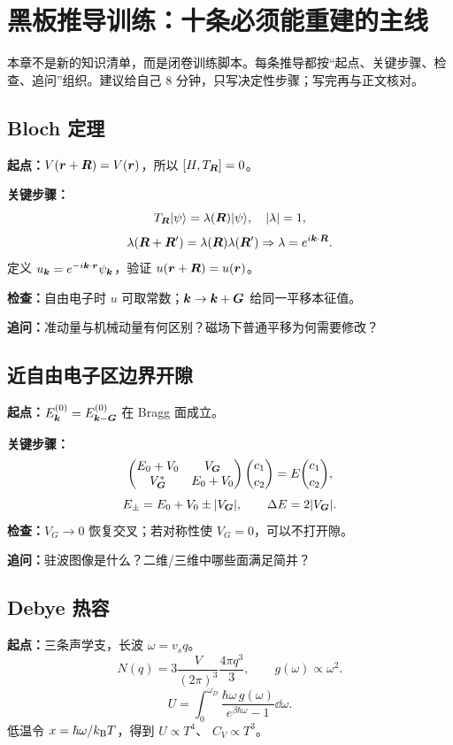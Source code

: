 \chapter{黑板推导训练：十条必须能重建的主线}

\begin{mapbox}
本章不是新的知识清单，而是闭卷训练脚本。每条推导都按“起点、关键步骤、检查、追问”组织。建议给自己 8 分钟，只写决定性步骤；写完再与正文核对。
\end{mapbox}

\section{Bloch 定理}
\textbf{起点：}$V(\bm{r}+\bm{R})=V(\bm{r})$，所以
$[H,T_{\bm{R}}]=0$。

\textbf{关键步骤：}
\[
T_{\bm{R}}|\psi\rangle=\lambda(\bm{R})|\psi\rangle,\quad
|\lambda|=1,
\]
\[
\lambda(\bm{R}+\bm{R}')=\lambda(\bm{R})\lambda(\bm{R}')
\Rightarrow\lambda=e^{i\bm{k}\cdot\bm{R}}.
\]
定义 $u_{\bm{k}}=e^{-i\bm{k}\cdot\bm{r}}\psi_{\bm{k}}$，验证
$u(\bm{r}+\bm{R})=u(\bm{r})$。

\textbf{检查：}自由电子时 $u$ 可取常数；$\bm{k}\to\bm{k}+\bm{G}$ 给同一平移本征值。

\textbf{追问：}准动量与机械动量有何区别？磁场下普通平移为何需要修改？

\section{近自由电子区边界开隙}
\textbf{起点：}$E_{\bm{k}}^{(0)}=E_{\bm{k}-\bm{G}}^{(0)}$ 在 Bragg 面成立。

\textbf{关键步骤：}
\[
\begin{pmatrix}
E_0+V_0&V_{\bm{G}}\\
V_{\bm{G}}^*&E_0+V_0
\end{pmatrix}
\binom{c_1}{c_2}=E\binom{c_1}{c_2},
\]
\[
E_\pm=E_0+V_0\pm|V_{\bm{G}}|,\qquad
\Delta E=2|V_{\bm{G}}|.
\]
\textbf{检查：}$V_G\to0$ 恢复交叉；若对称性使 $V_G=0$，可以不打开隙。

\textbf{追问：}驻波图像是什么？二维/三维中哪些面满足简并？

\section{Debye 热容}
\textbf{起点：}三条声学支，长波 $\omega=v_sq$。
\[
N(q)=3\frac{V}{(2\pi)^3}\frac{4\pi q^3}{3},
\qquad g(\omega)\propto\omega^2.
\]
\[
U=\int_0^{\omega_D}\frac{\hbar\omega\,g(\omega)}
{e^{\beta\hbar\omega}-1}\dd\omega.
\]
低温令 $x=\hbar\omega/k_{\mathrm B} T$，得到 $U\propto T^4$、
$C_V\propto T^3$。

